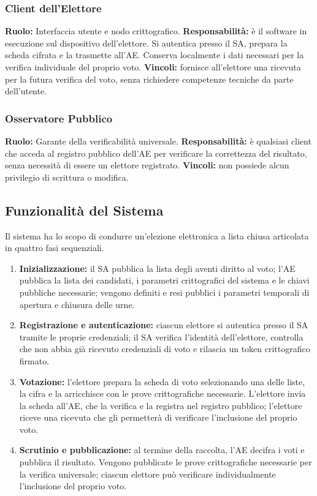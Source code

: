 \documentclass[12pt,a4paper]{article}
\begin{document}
\subsubsection{Client dell'Elettore}
\textbf{Ruolo:} Interfaccia utente e nodo crittografico.
\textbf{Responsabilità:} è il software in esecuzione sul dispositivo dell'elettore. Si autentica
presso il SA, prepara la scheda cifrata e la trasmette all'AE. Conserva localmente i dati
necessari per la verifica individuale del proprio voto.
\textbf{Vincoli:} fornisce all'elettore una ricevuta per la futura verifica del voto, senza
richiedere competenze tecniche da parte dell'utente.

\subsubsection{Osservatore Pubblico}
\textbf{Ruolo:} Garante della verificabilità universale.
\textbf{Responsabilità:} è qualsiasi client che acceda al registro pubblico dell'AE per verificare
la correttezza del risultato, senza necessità di essere un elettore registrato.
\textbf{Vincoli:} non possiede alcun privilegio di scrittura o modifica.

\subsection{Funzionalità del Sistema}

Il sistema ha lo scopo di condurre un'elezione elettronica a lista chiusa articolata in quattro
fasi sequenziali.

\begin{enumerate}
  \item \textbf{Inizializzazione:} il SA pubblica la lista degli aventi diritto al voto; l'AE
    pubblica la lista dei candidati, i parametri crittografici del sistema e le chiavi pubbliche
    necessarie; vengono definiti e resi pubblici i parametri temporali di apertura e chiusura
    delle urne.
  \item \textbf{Registrazione e autenticazione:} ciascun elettore si autentica presso il SA
    tramite le proprie credenziali; il SA verifica l'identità dell'elettore, controlla che non
    abbia già ricevuto credenziali di voto e rilascia un token crittografico firmato.
  \item \textbf{Votazione:} l'elettore prepara la scheda di voto selezionando una delle liste,
    la cifra e la arricchisce con le prove crittografiche necessarie. L'elettore invia la scheda
    all'AE, che la verifica e la registra nel registro pubblico; l'elettore riceve una ricevuta
    che gli permetterà di verificare l'inclusione del proprio voto.
  \item \textbf{Scrutinio e pubblicazione:} al termine della raccolta, l'AE decifra i voti e
    pubblica il risultato. Vengono pubblicate le prove crittografiche necessarie per la verifica
    universale; ciascun elettore può verificare individualmente l'inclusione del proprio voto.
\end{enumerate}
\end{document}
